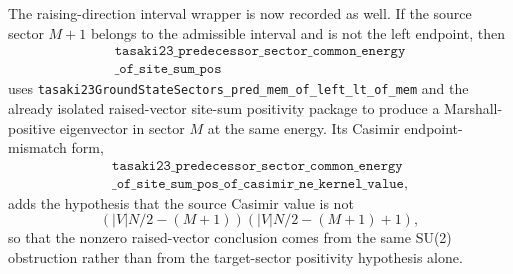 \documentclass[a4paper,11pt]{article}
\begin{document}
The raising-direction interval wrapper is now recorded as well.  If
the source sector \(M+1\) belongs to the admissible interval and is not
the left endpoint, then
\[
\begin{gathered}
\texttt{tasaki23\_predecessor\_sector\_common\_energy}\\
\texttt{\_of\_site\_sum\_pos}
\end{gathered}
\]
uses \texttt{tasaki23GroundStateSectors\_pred\_mem\_of\_left\_lt\_of\_mem}
and the already isolated raised-vector site-sum positivity package to
produce a Marshall-positive eigenvector in sector \(M\) at the same
energy.  Its Casimir endpoint-mismatch form,
\[
\begin{gathered}
\texttt{tasaki23\_predecessor\_sector\_common\_energy}\\
\texttt{\_of\_site\_sum\_pos\_of\_casimir\_ne\_kernel\_value},
\end{gathered}
\]
adds the hypothesis that the source Casimir value is not
\[
  \left(|V|N/2-(M+1)\right)
  \left(|V|N/2-(M+1)+1\right),
\]
so that the nonzero raised-vector conclusion comes from the same
SU(2) obstruction rather than from the target-sector positivity
hypothesis alone.
\end{document}

